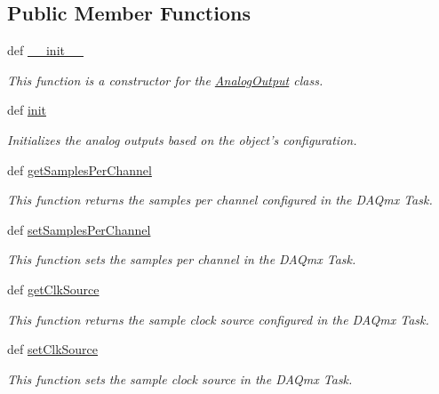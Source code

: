 \subsection*{Public Member Functions}
\begin{DoxyCompactItemize}
\item 
def \hyperlink{class_analog_output_1_1_analog_output_ad28820600816961e92acc55b7e87d8a3}{\-\_\-\-\_\-init\-\_\-\-\_\-}
\begin{DoxyCompactList}\small\item\em This function is a constructor for the \hyperlink{class_analog_output_1_1_analog_output}{Analog\-Output} class. \end{DoxyCompactList}\item 
def \hyperlink{class_analog_output_1_1_analog_output_ac2ebaea4a20d5a754b7758a322dcd317}{init}
\begin{DoxyCompactList}\small\item\em Initializes the analog outputs based on the object's configuration. \end{DoxyCompactList}\item 
def \hyperlink{class_analog_output_1_1_analog_output_a35ddeee69fe87b9956ba34a6a074e0ba}{get\-Samples\-Per\-Channel}
\begin{DoxyCompactList}\small\item\em This function returns the samples per channel configured in the D\-A\-Qmx Task. \end{DoxyCompactList}\item 
def \hyperlink{class_analog_output_1_1_analog_output_a090644cc9f7eb89e773c8e290c39e7fc}{set\-Samples\-Per\-Channel}
\begin{DoxyCompactList}\small\item\em This function sets the samples per channel in the D\-A\-Qmx Task. \end{DoxyCompactList}\item 
def \hyperlink{class_analog_output_1_1_analog_output_a82c8ed528235961775dd386c7fab6587}{get\-Clk\-Source}
\begin{DoxyCompactList}\small\item\em This function returns the sample clock source configured in the D\-A\-Qmx Task. \end{DoxyCompactList}\item 
def \hyperlink{class_analog_output_1_1_analog_output_a888663bef5a41818e2dadca65c56f4fc}{set\-Clk\-Source}
\begin{DoxyCompactList}\small\item\em This function sets the sample clock source in the D\-A\-Qmx Task. \end{DoxyCompactList}\item 

\end{DoxyCompactItemize}
